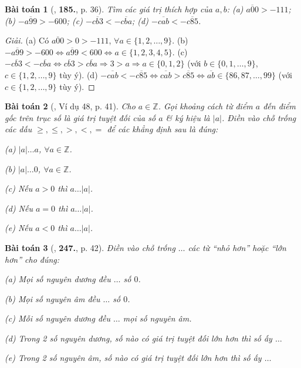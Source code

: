 \documentclass{article}
\numberwithin{equation}{section}
\newtheorem{baitoan}{Bài toán}
\begin{document}
\begin{baitoan}[\cite{Tuyen_Toan_6}, \textbf{185.}, p. 36]
	Tìm các giá trị thích hợp của $a,b$: (a) $\overline{a00} > -111$; (b) $-\overline{a99} > -600$; (c) $-\overline{cb3} < -\overline{cba}$; (d) $-\overline{cab} < -\overline{c85}$.
\end{baitoan}

\begin{proof}[Giải]
	(a) Có $\overline{a00} > 0 > -111$, $\forall a\in\{1,2,\ldots,9\}$. (b) $-\overline{a99} > -600\Leftrightarrow\overline{a99} < 600\Leftrightarrow a\in\{1,2,3,4,5\}$. (c) $-\overline{cb3} < -\overline{cba}\Leftrightarrow\overline{cb3} > \overline{cba}\Rightarrow 3 > a\Rightarrow a\in\{0,1,2\}$ (với $b\in\{0,1,\ldots,9\}$, $c\in\{1,2,\ldots,9\}$ tùy ý). (d) $-\overline{cab} < -\overline{c85}\Leftrightarrow\overline{cab} > \overline{c85}\Leftrightarrow\overline{ab}\in\{86,87,\ldots,99\}$ (với $c\in\{1,2,\ldots,9\}$ tùy ý).
\end{proof}

\begin{baitoan}[\cite{Binh_Toan_6_tap_1}, Ví dụ 48, p. 41]
	Cho $a\in\mathbb{Z}$. Gọi khoảng cách từ điểm $a$ đến điểm gốc trên trục số là \emph{giá trị tuyệt đối} của số $a$ \& ký hiệu là $|a|$. Điền vào chỗ trống các dấu $\ge,\le,>,<,=$ để các khẳng định sau là đúng:
	\begin{enumerate*}
		\item[(a)] $|a|\ldots a$, $\forall a\in\mathbb{Z}$.
		\item[(b)] $|a|\ldots 0$, $\forall a\in\mathbb{Z}$.
		\item[(c)] Nếu $a > 0$ thì $a\ldots|a|$.
		\item[(d)] Nếu $a = 0$ thì $a\ldots|a|$.
		\item[(e)] Nếu $a < 0$ thì $a\ldots|a|$.
	\end{enumerate*}
\end{baitoan}

\begin{baitoan}[\cite{Binh_Toan_6_tap_1}, \textbf{247.}, p. 42]
	Điền vào chỗ trống $\ldots$ các từ ``nhỏ hơn'' hoặc ``lớn hơn'' cho đúng:
	\begin{enumerate*}
		\item[(a)] Mọi số nguyên dương đều $\ldots$ số $0$.
		\item[(b)] Mọi số nguyên âm đều $\ldots$ số $0$.
		\item[(c)] Mỗi số nguyên dương đều $\ldots$ mọi số nguyên âm.
		\item[(d)] Trong 2 số nguyên dương, số nào có giá trị tuyệt đối lớn hơn thì số ấy $\ldots$
		\item[(e)] Trong 2 số nguyên âm, số nào có giá trị tuyệt đối lớn hơn thì số ấy $\ldots$
	\end{enumerate*}
\end{baitoan}
\end{document}
